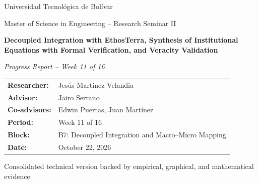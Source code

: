 \documentclass[11pt,a4paper]{article}
\begin{document}
\begin{titlepage}
    \thispagestyle{empty}
    \centering
    \vspace*{1.5cm}

    {\large Universidad Tecnol\'ogica de Bol\'ivar\par}
    \vspace{0.3cm}
    {\normalsize Master of Science in Engineering -- Research Seminar II\par}

    \vspace{2.0cm}
    {\LARGE\bfseries Decoupled Integration with EthosTerra, Synthesis of Institutional Equations with Formal Verification, and Veracity Validation\par}

    \vspace{0.8cm}
    {\large\itshape Progress Report -- Week 11 of 16\par}

    \vspace{2.2cm}
    \begin{tabular}{ll}
        \textbf{Researcher:} & Jes\'us Mart\'inez Velandia \\
        \textbf{Advisor:} & Jairo Serrano \\
        \textbf{Co-advisors:} & Edwin Puertas, Juan Mart\'inez \\
        \textbf{Period:} & Week 11 of 16 \\
        \textbf{Block:} & B7: Decoupled Integration and Macro--Micro Mapping \\
        \textbf{Date:} & October 22, 2026 \\
    \end{tabular}

    \vfill
    {\small Consolidated technical version backed by empirical, graphical, and mathematical evidence\par}
    \vspace*{1.0cm}
\end{titlepage}

\clearpage
\hypersetup{pageanchor=true}
\setcounter{page}{1}
\fancyfoot[C]{\small \thepage}
\tableofcontents
\clearpage

\setcounter{page}{1}
\end{document}

